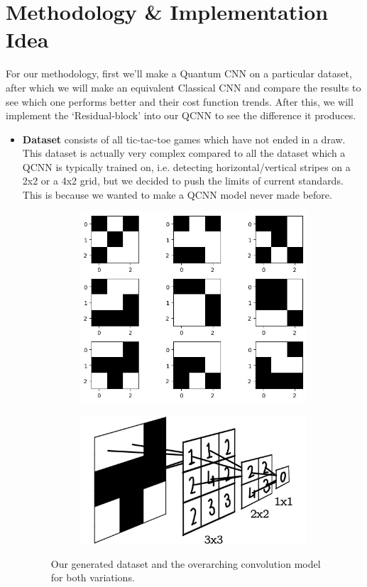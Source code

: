 \documentclass[a4paper]{article}
\begin{document}
\section*{Methodology \& Implementation Idea}

For our methodology, first we'll make a Quantum CNN on a particular dataset, after which we will make an equivalent Classical CNN and compare the results to see which one performs better and their cost function trends. After this, we will implement the `Residual-block' into our QCNN to see the difference it produces. 
\begin{itemize}
\item \textbf{Dataset} consists of all tic-tac-toe games which have not ended in a draw. This dataset is actually very complex compared to all the dataset which a QCNN is typically trained on, i.e. detecting horizontal/vertical stripes on a 2x2 or a 4x2 grid, but we decided to push the limits of current standards. This is because we wanted to make a QCNN model never made before.

\begin{figure}[h]
\centering
\begin{subfigure}{.5\textwidth}
  \centering
\includegraphics[height = 0.5\textwidth]{assets/dataset.jpeg}
  \label{fig:sub1}
\end{subfigure}%
\begin{subfigure}{.5\textwidth}
  \centering
  \includegraphics[height=.5\linewidth]{assets/CCNN.png}
  \label{fig:sub2}
\end{subfigure}
\caption{Our generated dataset and the overarching convolution model for both variations.}
\label{fig:test}
\end{figure}


\end{itemize}
\end{document}
